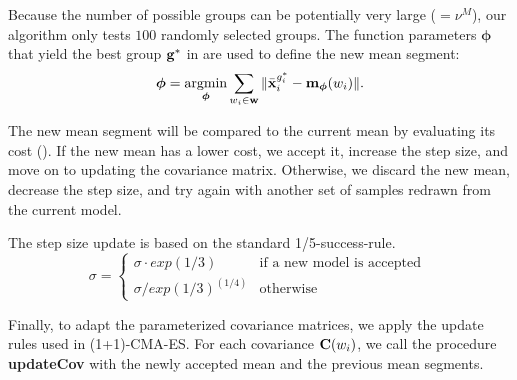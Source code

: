 Because the number of possible groups can be potentially very large
($=\nu^M$), our algorithm only tests $100$ randomly selected groups. The function parameters
$\boldsymbol{\phi}$ that yield the best group $\mathbf{g}^*$ in
 are used to define the new mean segment:
\begin{equation}
  \boldsymbol{\phi} = \argmin_{\boldsymbol{\phi}} \sum_{w_i \in \vc{w}} \| \bar{\vc{x}}_i^{g^*_i} -
  \vc{m}_{\boldsymbol{\phi}} (w_i) \|.
  \label{eq:optskills_regression2}
\end{equation}  

The new mean segment will be compared to the
current mean by evaluating its cost ().
If the new mean has a lower cost, we accept it, increase the step
size, and move on to updating the covariance matrix. Otherwise, we
discard the new mean, decrease the step size, and try again with
another set of samples redrawn from the current model.

The step size update is based on the standard 1/5-success-rule.
\begin{equation}
  \sigma = \begin{cases} 
    \sigma \cdot exp(1/3) & \text{if a new model is accepted } \\
    \sigma / exp(1/3)^{(1/4)} & \text{otherwise }
  \end{cases}
\end{equation}  

Finally, to adapt the parameterized covariance matrices, we apply the update rules used in (1+1)-CMA-ES.
For each covariance $\mathbf{C}(w_i)$, we call the procedure \textbf{updateCov} with
the newly accepted mean and the previous mean segments.


